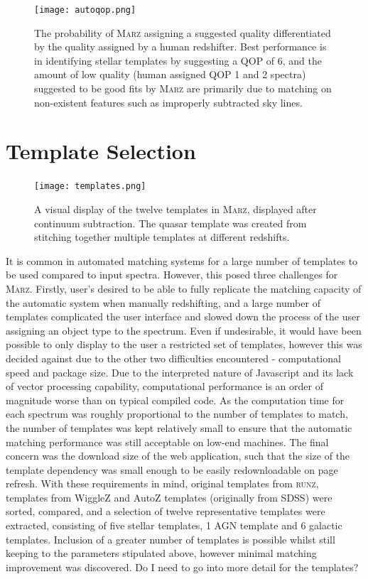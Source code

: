 \documentclass[iop]{emulateapj}
\newcommand{\green}{\color{LimeGreen}}
\newcommand{\runz}{\textsc{runz}}
\newcommand{\marz}{\textsc{Marz}}
\begin{document}
\begin{figure}[h]
\centering
\texttt{[image: autoqop.png]}
\caption{The probability of \marz{} assigning a suggested quality differentiated by the quality assigned by a human redshifter. Best performance is in identifying stellar templates by suggesting a QOP of 6, and the amount of low quality (human assigned QOP 1 and 2 spectra) suggested to be good fits by \marz{} are primarily due to matching on non-existent features such as improperly subtracted sky lines.}
\label{fig:autoqop}
\end{figure}




\section{Template Selection}



\begin{figure}[h]
\centering
\texttt{[image: templates.png]}
\caption{A visual display of the twelve templates in \marz{}, displayed after continuum subtraction. The quasar template was created from stitching together multiple templates at different redshifts.}
\label{fig:templates}
\end{figure}


It is common in automated matching systems for a large number of templates to be used compared to input spectra. However, this posed three challenges for \marz{}. Firstly, user's desired to be able to fully replicate the matching capacity of the automatic system when manually redshifting, and a large number of templates complicated the user interface and slowed down the process of the user assigning an object type to the spectrum. Even if undesirable, it would have been possible to only display to the user a restricted set of templates, however this was decided against due to the other two difficulties encountered - computational speed and package size. Due to the interpreted nature of Javascript and its lack of vector processing capability, computational performance is an order of magnitude worse than on typical compiled code. As the computation time for each spectrum was roughly proportional to the number of templates to match, the number of templates was kept relatively small to ensure that the automatic matching performance was still acceptable on low-end machines. The final concern was the download size of the web application, such that the size of the template dependency was small enough to be easily redownloadable on page refresh. With these requirements in mind, original templates from \runz{}, templates from WiggleZ and AutoZ templates (originally from SDSS) were sorted, compared, and a selection of twelve representative templates were extracted, consisting of five stellar templates, 1 AGN template and 6 galactic templates. Inclusion of a greater number of templates is possible whilst still keeping to the parameters stipulated above, however minimal matching improvement was discovered. {\green Do I need to go into more detail for the templates?}
\end{document}

